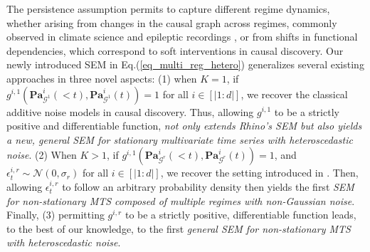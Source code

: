 The persistence assumption permits to capture different regime dynamics, whether arising from changes in the causal graph across regimes, commonly observed in climate science \citep{karmouche2023regime} and epileptic recordings \citep{wang2024ictal}, or from shifts in functional dependencies, which correspond to soft interventions in causal discovery. Our newly introduced SEM in Eq.(\ref{eq_multi_reg_hetero}) generalizes several existing approaches in three novel aspects: (1) when $K=1$, if $g^{i,1}(\mathbf{Pa}_{\mathcal{G}^1}^i(<t), \mathbf{Pa}_{\mathcal{G}^1}^i(t)) = 1$ for all $i \in [|1:d|]$, we recover the classical additive noise models in causal discovery. Thus, allowing $g^{i,1}$ to be a strictly positive and differentiable function,  \textit{not only extends Rhino’s SEM \citep{gong2022rhino} but also yields a new, general SEM for stationary multivariate time series with heteroscedastic noise}.  (2) When $K>1$, if $g^{i,1}(\mathbf{Pa}_{\mathcal{G}^r}^i(<t), \mathbf{Pa}_{\mathcal{G}^r}^i(t)) = 1$, and $\epsilon_t^{i,r} \sim \mathcal{N}(0, \sigma_r)$ for all $i \in [|1:d|]$, we recover the setting introduced in \citep{rahmanicausal,balsells2023identifiability}. Then, allowing $\epsilon_t^{i,r}$ to follow an arbitrary probability density then yields the first \textit{SEM for non-stationary MTS composed of multiple regimes with non-Gaussian noise}. Finally, (3) permitting $g^{i,r}$ to be a strictly positive, differentiable function leads, to the best of our knowledge, to the first \textit{general SEM for non-stationary MTS with heteroscedastic noise}.

